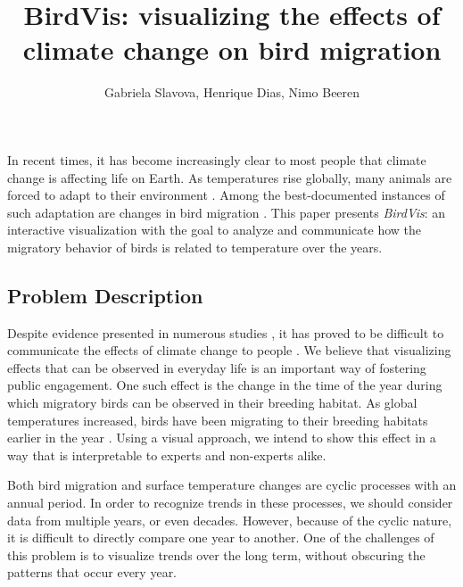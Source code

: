 \documentclass[journal]{vgtc}                %
\title{BirdVis: visualizing the effects of climate change on bird migration}
\author{Gabriela Slavova, Henrique Dias, Nimo Beeren}
\begin{document}


\maketitle

In recent times, it has become increasingly clear to most people that climate change is affecting life on Earth. As temperatures rise globally, many animals are forced to adapt to their environment \cite{parmesan2007pheno,root2003fingerprints}. Among the best-documented instances of such adaptation are changes in bird migration \cite{miller2008bird,cotton2003avian,jenni2003timing}. This paper presents \emph{BirdVis}: an interactive visualization with the goal to analyze and communicate how the migratory behavior of birds is related to temperature over the years.

\subsection{Problem Description}

Despite evidence presented in numerous studies \cite{solomon2007climate,parry2007climate}, it has proved to be difficult to communicate the effects of climate change to people \cite{moser2011communicating}. We believe that visualizing effects that can be observed in everyday life is an important way of fostering public engagement. One such effect is the change in the time of the year during which migratory birds can be observed in their breeding habitat. As global temperatures increased, birds have been migrating to their breeding habitats earlier in the year \cite{jenni2003timing}. Using a visual approach, we intend to show this effect in a way that is interpretable to experts and non-experts alike.

Both bird migration and surface temperature changes are cyclic processes with an annual period. In order to recognize trends in these processes, we should consider data from multiple years, or even decades. However, because of the cyclic nature, it is difficult to directly compare one year to another. One of the challenges of this problem is to visualize trends over the long term, without obscuring the patterns that occur every year.
\end{document}
